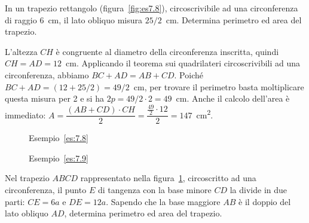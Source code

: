 \begin{exrig}
\begin{esempio}\label{es:7.8}
In un trapezio rettangolo (figura~\ref{fig:es7.8}), circoscrivibile ad una circonferenza di raggio 6~cm, il lato obliquo misura $25/2$~cm. Determina perimetro ed area del trapezio.\vspace{7pt}

L'altezza $CH$ è congruente al diametro della circonferenza inscritta, quindi $CH = AD = 12$~cm.
Applicando il teorema sui quadrilateri circoscrivibili ad una circonferenza, abbiamo $BC + AD = AB + CD$.
Poiché $BC + AD = (12 + 25/2) = 49/2$~cm, per trovare il perimetro basta moltiplicare questa misura per 2 e si ha $2p=49/2 \cdot 2=49$~cm.
Anche il calcolo dell'area è immediato: $A=\dfrac{(AB+CD)\cdot CH}{2}=\dfrac{\frac{49}{2}\cdot 12}{2}=147$~cm\textsuperscript{2}. 
\end{esempio}

\begin{figure}[!htb]
	\begin{center}
		\begin{minipage}{0.45\textwidth}
			\centering
			
			\caption{Esempio~\ref{es:7.8}}\label{fig:es7.8}
		\end{minipage}
		\hspace{0.03\textwidth}	
		\begin{minipage}{0.45\textwidth}
			\centering
			
			\caption{Esempio~\ref{es:7.9}}\label{fig:es7.9}
		\end{minipage}
	\end{center}
\end{figure}

\begin{esempio}\label{es:7.9}
Nel trapezio $ABCD$ rappresentato nella figura~\ref{fig:es7.9}, circoscritto ad una circonferenza, il punto $E$ di tangenza con la base minore $CD$ la divide in due parti: $CE = 6a$ e $DE = 12a$. Sapendo che la base maggiore $AB$ è il doppio del lato obliquo $AD$, determina perimetro ed area del trapezio.\vspace{7pt}


\end{esempio}
\end{exrig}
